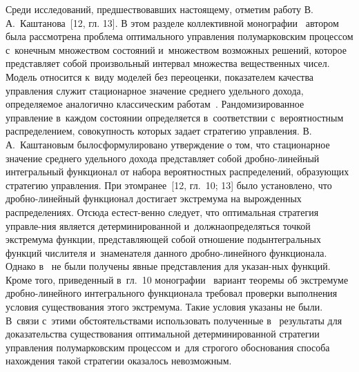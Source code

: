 \begin{multicols}{2}
Среди исследований, предшествовавших настоящему, отметим работу 
В.\,А.~Каштанова~[12, гл. 13]. В этом разделе коллективной монографии~\cite{12} 
автором была рассмотрена проблема оптимального управления полумарковским 
процессом с~конечным множеством состояний и~множеством возможных решений, 
которое представляет собой произвольный интервал множества вещественных чисел. 
Модель относится к~виду моделей без переоценки, показателем качества управления 
служит стационарное значение среднего удельного дохода, определяемое аналогично 
классическим работам~\cite{3, 8}. Рандомизированное управление в~каждом состоянии 
определяется в~соответствии с~вероятностным распределением, совокупность которых 
задает\linebreak
 стратегию управления. В.\,А.~Каш\-та\-но\-вым было\linebreak сформулировано утверждение о том, 
что стацио\-нарное значение среднего удельного дохода представляет собой 
дроб\-но-ли\-ней\-ный интегральный функционал от набора вероятностных распределений, 
образующих стратегию управления. При этом\linebreak ранее~[12, гл.~10; 13] было уста\-нов\-ле\-но, 
что дроб\-но-ли\-ней\-ный функционал достигает экстремума на вырожденных распределениях. 
Отсюда естест-\linebreak венно следует, что оптимальная стратегия управ\-ле-ния является 
детерминированной и~должна\linebreak определяться точкой экстремума функции, представляющей 
собой отношение подынтегральных функций чис\-ли\-те\-ля и~знаменателя данного 
дроб\-но-ли\-ней\-но\-го функционала. Однако в~\cite{12} не были получены явные 
представления для указан-\linebreak ных функций. Кроме того, приведенный в~гл.~10 
монографии~\cite{12} вариант теоремы об экстремуме дроб\-но-ли\-ней\-но\-го 
интегрального функционала требовал проверки выполнения условия существования 
этого экстремума. Такие условия указаны не были. В~связи с~этими обстоятельствами 
использовать полученные в~\cite{12} результаты для доказательства существования 
оптимальной детерминированной стратегии управ\-ле\-ния полумарковским процессом и~для 
строгого обоснования способа нахождения такой стратегии оказалось невозможным.


\end{multicols}
